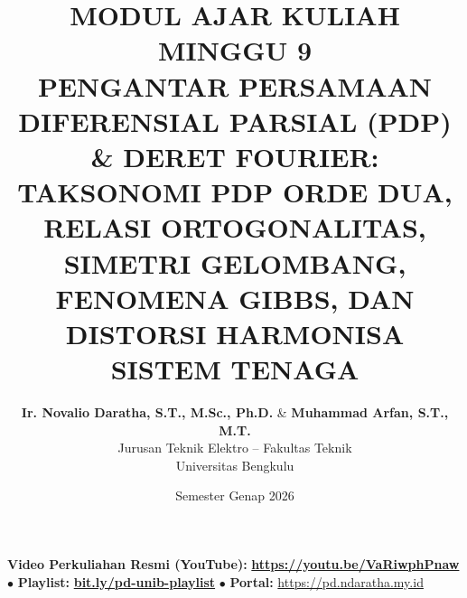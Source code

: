 \documentclass[11pt,a4paper]{article}
\title{\textbf{\Large MODUL AJAR KULIAH MINGGU 9}\\[0.3cm]
\textbf{\LARGE PENGANTAR PERSAMAAN DIFERENSIAL PARSIAL (PDP) \& DERET FOURIER: TAKSONOMI PDP ORDE DUA, RELASI ORTOGONALITAS, SIMETRI GELOMBANG, FENOMENA GIBBS, DAN DISTORSI HARMONISA SISTEM TENAGA}}
\author{\textbf{Ir. Novalio Daratha, S.T., M.Sc., Ph.D.} \& \textbf{Muhammad Arfan, S.T., M.T.} \\ 
Jurusan Teknik Elektro -- Fakultas Teknik \\ 
Universitas Bengkulu}
\date{Semester Genap 2026}
\theoremstyle{definition}
\begin{document}
\maketitle
\begin{center}
  \vspace{-0.25cm}
  \begin{tcolorbox}[colback=red!4!white,colframe=red!75!black,boxrule=0.5pt,arc=2pt,left=6pt,right=6pt,top=3pt,bottom=3pt,width=0.98\textwidth]
    \centering\footnotesize
    \textbf{Video Perkuliahan Resmi (YouTube):} {\color{red!80!black}\textbf{\url{https://youtu.be/VaRiwphPnaw}}} \quad $\bullet$ \quad \textbf{Playlist:} \href{https://www.youtube.com/playlist?list=PLS5oOZWXZeTw}{\color{blue!80!black}\textbf{bit.ly/pd-unib-playlist}} \quad $\bullet$ \quad \textbf{Portal:} \url{https://pd.ndaratha.my.id}
  \end{tcolorbox}
  \vspace{-0.15cm}
\end{center}
\end{document}
